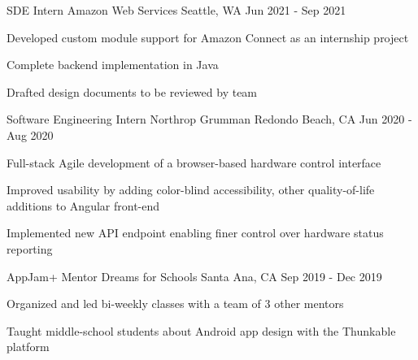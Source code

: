 
\begin{cventries}
	\cventry
	{SDE Intern}
	{Amazon Web Services}
	{Seattle, WA}
	{Jun 2021 - Sep 2021}
	{
		\begin{cvitems}
			\item{Developed custom module support for Amazon Connect as an internship project}
			\item{Complete backend implementation in Java}
			\item{Drafted design documents to be reviewed by team}
		\end{cvitems}
	}
	\cventry
	{Software Engineering Intern}
	{Northrop Grumman}
	{Redondo Beach, CA}
	{Jun 2020 - Aug 2020}
	{
		\begin{cvitems}
			\item{Full-stack Agile development of a browser-based hardware control interface}
			\item{Improved usability by adding color-blind accessibility, other quality-of-life additions to Angular front-end}
			\item{Implemented new API endpoint enabling finer control over hardware status reporting}
		\end{cvitems}
	}

	\cventry
	{AppJam+ Mentor}
	{Dreams for Schools}
	{Santa Ana, CA}
	{Sep 2019 - Dec 2019}
	{
	\begin{cvitems}
		\item{Organized and led bi-weekly classes with a team of 3 other mentors}
		\item{Taught middle-school students about Android app design with the Thunkable platform}
	\end{cvitems}
	}
\end{cventries}
